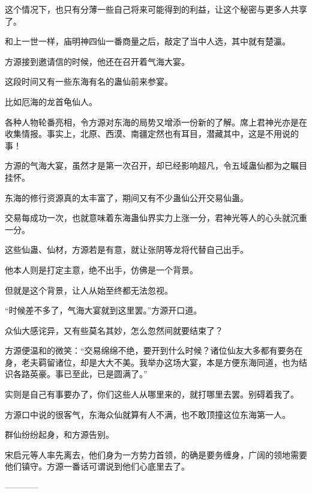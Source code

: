 \begin{this_body}
这个情况下，也只有分薄一些自己将来可能得到的利益，让这个秘密与更多人共享了。

和上一世一样，庙明神四仙一番商量之后，敲定了当中人选，其中就有楚瀛。

方源接到邀请信的时候，他还在召开着气海大宴。

这段时间又有一些东海有名的蛊仙前来参宴。

比如厄海的龙首龟仙人。

各种人物轮番亮相，令方源对东海的局势又增添一份新的了解。席上君神光亦是在收集情报。事实上，北原、西漠、南疆定然也有耳目，潜藏其中，这是不用说的事！

方源的气海大宴，虽然才是第一次召开，却已经影响超凡，令五域蛊仙都为之瞩目挂怀。

东海的修行资源真的太丰富了，期间又有不少蛊仙公开交易仙蛊。

交易每成功一次，也就意味着东海蛊仙界实力上涨一分，君神光等人的心头就沉重一分。

这些仙蛊、仙材，方源若是有意，就让张阴等龙将代替自己出手。

他本人则是打定主意，绝不出手，仿佛是一个背景。

但就是这个背景，让人从始至终都无法忽视。

“时候差不多了，气海大宴就到这里罢。”方源开口道。

众仙大感诧异，又有些莫名其妙，怎么忽然间就要结束了？

方源便温和的微笑：“交易绵绵不绝，要开到什么时候？诸位仙友大多都有要务在身，老夫羁留诸位，却是大大不美。我举办这场大宴，本是方便东海同道，也为结识各路英豪。事已至此，已是圆满了。”

实则是自己有事要办了，你们这些人从哪里来的，就打哪里去罢。别碍着我了。

方源口中说的很客气，东海众仙就算有人不满，也不敢顶撞这位东海第一人。

群仙纷纷起身，和方源告别。

宋启元等人率先离去，他们身为一方势力首领，的确是要务缠身，广阔的领地需要他们镇守。方源一番话可谓说到他们心底里去了。

------------

\end{this_body}

